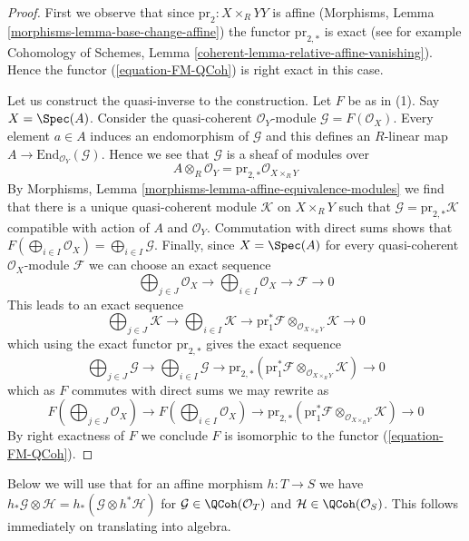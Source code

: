 \begin{proof}
First we observe that since $\text{pr}_2 : X \times_R Y Y$ is affine
(Morphisms, Lemma \ref{morphisms-lemma-base-change-affine}) the functor
$\text{pr}_{2, *}$ is exact (see for example Cohomology of Schemes, Lemma
\ref{coherent-lemma-relative-affine-vanishing}). Hence the functor
(\ref{equation-FM-QCoh}) is right exact in this case.

\medskip\noindent
Let us construct the quasi-inverse to the construction. Let $F$ be
as in (1). Say $X = \Spec(A)$. Consider the quasi-coherent
$\mathcal{O}_Y$-module $\mathcal{G} = F(\mathcal{O}_X)$.
Every element $a \in A$ induces an endomorphism of $\mathcal{G}$
and this defines an $R$-linear map
$A \to \text{End}_{\mathcal{O}_Y}(\mathcal{G})$. Hence we see that
$\mathcal{G}$ is a sheaf of modules over
$$
A \otimes_R \mathcal{O}_Y = \text{pr}_{2, *}\mathcal{O}_{X \times_R Y}
$$
By Morphisms, Lemma \ref{morphisms-lemma-affine-equivalence-modules}
we find that there is a unique
quasi-coherent module $\mathcal{K}$ on $X \times_R Y$ such that
$\mathcal{G} = \text{pr}_{2, *}\mathcal{K}$ compatible with action
of $A$ and $\mathcal{O}_Y$. Commutation with direct sums shows that
$F(\bigoplus_{i \in I} \mathcal{O}_X) = \bigoplus_{i \in I} \mathcal{G}$.
Finally, since $X = \Spec(A)$ for every quasi-coherent $\mathcal{O}_X$-module
$\mathcal{F}$ we can choose an exact sequence
$$
\bigoplus\nolimits_{j \in J} \mathcal{O}_X \to
\bigoplus\nolimits_{i \in I} \mathcal{O}_X \to \mathcal{F} \to 0
$$
This leads to an exact sequence
$$
\bigoplus\nolimits_{j \in J} \mathcal{K} \to
\bigoplus\nolimits_{i \in I} \mathcal{K} \to
\text{pr}_1^*\mathcal{F} \otimes_{\mathcal{O}_{X \times_R Y}} \mathcal{K} \to 0
$$
which using the exact functor $\text{pr}_{2, *}$ gives the exact sequence
$$
\bigoplus\nolimits_{j \in J} \mathcal{G} \to
\bigoplus\nolimits_{i \in I} \mathcal{G} \to
\text{pr}_{2, *}(\text{pr}_1^*\mathcal{F}
\otimes_{\mathcal{O}_{X \times_R Y}} \mathcal{K})
\to 0
$$
which as $F$ commutes with direct sums we may rewrite as
$$
F(\bigoplus\nolimits_{j \in J} \mathcal{O}_X) \to
F(\bigoplus\nolimits_{i \in I} \mathcal{O}_X) \to
\text{pr}_{2, *}(\text{pr}_1^*\mathcal{F}
\otimes_{\mathcal{O}_{X \times_R Y}} \mathcal{K})
\to 0
$$
By right exactness of $F$ we conclude $F$ is isomorphic to
the functor (\ref{equation-FM-QCoh}).
\end{proof}

\begin{remark}
\label{remark-affine-morphism}
Below we will use that for an affine morphism
$h : T \to S$ we have $h_*\mathcal{G} \otimes \mathcal{H} =
h_*(\mathcal{G} \otimes h^*\mathcal{H})$ for
$\mathcal{G} \in \QCoh(\mathcal{O}_T)$ and
$\mathcal{H} \in \QCoh(\mathcal{O}_S)$. This follows
immediately on translating into algebra.
\end{remark}

